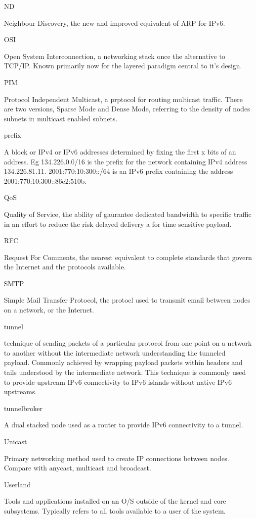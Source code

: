 ND

Neighbour Discovery, the new and improved equivalent of ARP for IPv6.

OSI

Open System Interconnection, a networking stack once the alternative to
TCP/IP. Known primarily now for the layered paradigm central to it's
design.

PIM

Protocol Independent Multicast, a prptocol for routing multicast
traffic. There are two versions, Sparse Mode and Dense Mode, referring
to the density of nodes subnets in multicast enabled subnets.

prefix

A block or IPv4 or IPv6 addresses determined by fixing the first x bits
of an address. Eg 134.226.0.0/16 is the prefix for the network
containing IPv4 address 134.226.81.11. 2001:770:10:300::/64 is an IPv6
prefix containing the address 2001:770:10:300::86e2:510b. 

QoS

Quality of Service, the ability of gaurantee dedicated bandwidth to
specific traffic in an effort to reduce the risk delayed delivery a for
time sensitive payload.

RFC

Request For Comments, the nearest equivalent to complete standards that
govern the Internet and the protocols available.

SMTP

Simple Mail Transfer Protocol, the protocl used to transmit email
between nodes on a network, or the Internet.

tunnel

technique of sending packets of a particular protocol from one point on
a network to another without the intermediate network understanding the
tunneled payload. Commonly achieved by wrapping payload packets within
headers and tails understood by the intermediate network. This
technique is commonly used to provide upstream IPv6 connectivity to IPv6
islands without native IPv6 upstreams.

tunnelbroker

A dual stacked node used as a router to provide IPv6 connectivity to a
tunnel.

Unicast

Primary networking method used to create IP connections between nodes.
Compare with anycast, multicast and broadcast.

Userland

Tools and applications installed on an O/S outside of the kernel and
core subsystems. Typically refers to all tools available to a user of
the system.
